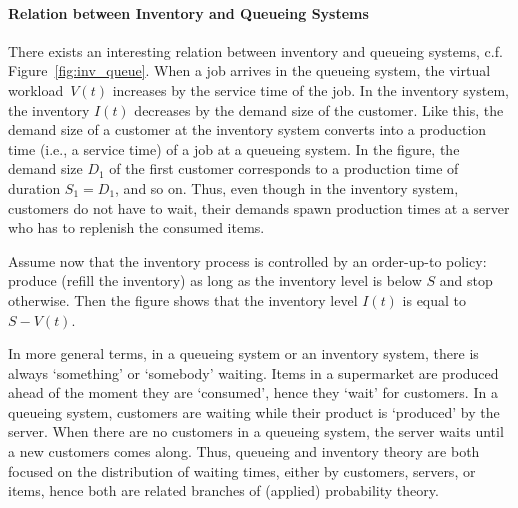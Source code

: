 \paragraph{Relation between Inventory and Queueing Systems}

There exists an interesting relation between inventory and queueing systems, c.f. Figure~\ref{fig:inv_queue}.  When a job arrives in the queueing system, the virtual workload~$V(t)$ increases by the service time of the job. In the inventory system, the inventory $I(t)$ decreases by the  demand size of the customer. Like this, the demand size of a customer at the inventory system converts into a production time (i.e., a service time) of a job at a queueing  system. In the figure, the demand size $D_1$  of the first customer corresponds to a production time of duration  $S_1=D_1$, and so on. Thus, even though in the inventory system, customers do not have to wait, their demands spawn production times at a server who has to replenish the consumed items. 

Assume now that  the inventory process is controlled by an order-up-to policy: produce (refill the inventory) as long as the inventory level is below $S$ and stop otherwise.  Then the figure shows that the inventory level $I(t)$ is equal to $S-V(t)$.   

In more general terms, in a queueing system or an inventory system, there is always `something' or `somebody'  waiting. Items in a supermarket are produced ahead of the moment they are `consumed', hence they `wait' for customers. In a queueing system, customers are waiting  while their product is `produced' by the server. When there are no customers in a queueing system, the server waits until a new customers comes along. Thus, queueing and inventory theory are both focused on the distribution of waiting times, either by customers, servers, or items, hence  both are related branches of (applied) probability theory.


